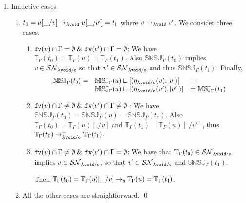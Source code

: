 \documentclass{LMCS}
\renewcommand{\>}{\rightarrow}
\def\lam{\lambda}
\def\Gam{\Gamma}
\newcommand{\Rew}[1]{\rightarrow_{#1}}
\newcommand{\SN}[1]{\mathcal{SN}_{#1}}
\newcommand{\multiset}[1]{ [ #1 ] }
\newcommand{\pair}[2]{\langle #1, #2 \rangle}
\newcommand{\Rewplus}[1]{\rightarrow^{+}_{#1}}
\newcommand{\fv}[1]{{\tt fv}(#1)}
\newcommand{\ems}{\emptyset}
\newcommand{\ih}{i.h.}
\newcommand{\modulo}[2]{#1/#2}
\newcommand{\ignore}[1]{}
\newcommand{\osymb}{{\tt o}}
\newcommand{\aux}{{\tt void}}
\newcommand{\laux}{\lam\aux}
\newcommand{\lauxm}{\lam\modulo{ \aux }{ \osymb }}
\newcommand{\New}{{\tt h}}
\newcommand{\snsudd}[2]{\mathbb{SNSJ}_{#1}(#2)}
\newcommand{\etamd}[2]{\mathbb{MSJ}_{#1}(#2)}
\newcommand{\surf}[2]{\mathbb{T}_{#1}(#2)}
\newcommand{\void}{\_}
\newcommand{\gm}{\sqsupset}
\begin{document}
\begin{enumerate}[$\bullet$]
\item Inductive cases:
\begin{enumerate}[$-$]
\item $t_0= u[\void/v] \Rew{\laux} u[\void/v'] = t_1$
  where $v  \Rew{\laux} v'$.  We consider three cases.
 
  \begin{enumerate}[(1)]
  \item  \emph{$\fv{v} \cap \Gam = \ems\ \&\ \fv{v'} \cap \Gam =\ems$}: 
  We have $\surf{\Gam}{t_0} = \surf{\Gam}{u} = \surf{\Gam}{t_1}$.
  Also  $\snsudd{\Gam}{t_0}$ implies $v \in \SN{\lauxm}$ so that 
   $v' \in \SN{\lauxm}$ and thus $\snsudd{\Gam}{t_1}$.
  Finally, 
  \[ \begin{array}{lll} 
    \etamd{\Gam}{t_0}  =  &  \etamd{\Gam}{u} \sqcup
    \multiset{\pair{\eta_{\lauxm}(v)}{|v|}} & \gm \\ 
    & \etamd{\Gam }{u} \sqcup
             \multiset{\pair{\eta_{\lauxm}(v')}{|v'|}}  & = 
   \etamd{\Gam}{t_1} 
   \end{array} \]
  
\item \emph{$\fv{v} \cap \Gam \neq \ems\ \&\ \fv{v'} \cap \Gam \neq
  \ems$ } : We have
  $\snsudd{\Gam}{t_0}=\snsudd{\Gam}{u}=\snsudd{\Gam}{t_1}$.  Also
  $\surf{\Gam}{t_0}=\surf{\Gam}{u}[\void/v]$ and
  $\surf{\Gam}{t_1}=\surf{\Gam}{u}[\void/v']$, thus
  $\surf{\Gam}{t_0} \Rewplus{\lauxm} \surf{\Gam}{t_1}$.
 

\item  \emph{$\fv{v} \cap \Gam \neq  \ems\ \&\ \fv{v'} \cap \Gam = \ems$}:   
 We have that $\surf{\Gam}{t_0}\in \SN{\lauxm}$ implies  $v\in\SN{\lauxm}$, 
so that $v'\in\SN{\lauxm}$ and $\snsudd{\Gam}{t_1}$. 

Then $\surf{\Gam}{t_0}=\surf{\Gam }{u}[\void/ v] 
   \Rew{\New} \surf{\Gam }{u}= \surf{\Gam}{t_1}$.  

   \end{enumerate}
\ignore{
\item $t_0 = u v  \Rew{\laux} u' v = t_1$, where $u  \Rew{\laux} u'$.
This case is straightforward  by the \ih\
\item $t_0 = u v \Rew{\laux} u v' = t_1$, where $v  \Rew{\laux} v'$.
This case is also straightforward  by the \ih\
\item $t_0=\lam x. s\Rew{\laux} \lam x. s' = t_1$: just use the \ih\
\item $t_0= u[\void/v] \Rew{\laux} u'[\void/v] = t_1$: just use the \ih }
\item All the other cases are straightforward.
\qed
\end{enumerate}
\end{enumerate}
\end{document}
